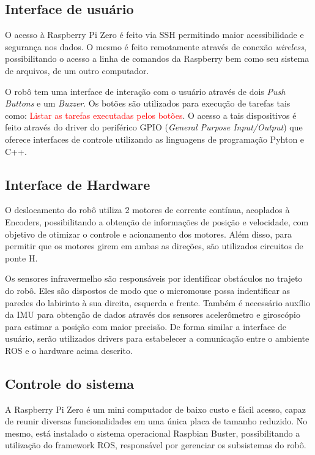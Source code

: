 \subsection{Interface de usuário}
\label{ssec:interface_de_usuario}
O acesso à Raspberry Pi Zero é feito via SSH permitindo maior acessibilidade e segurança nos dados. O mesmo é feito remotamente através de conexão \textit{wireless}, possibilitando o acesso a linha de comandos da Raspberry bem como seu sistema de arquivos, de um outro computador.
 
O robô tem uma interface de interação com o usuário através de dois \textit{Push Buttons} e um \textit{Buzzer}. Os botões são utilizados para execução de tarefas tais como: \textcolor{red}{Listar as tarefas executadas pelos botões}. O acesso a tais dispositivos é feito através do driver do periférico GPIO (\textit{General Purpose Input/Output}) que oferece interfaces de controle utilizando as linguagens de programação Pyhton e C++.

\subsection{Interface de Hardware}
\label{ssec:interface_de_hardware}
O deslocamento do robô utiliza 2 motores de corrente contínua, acoplados à Encoders, possibilitando a obtenção de informações de posição e velocidade, com objetivo de otimizar o controle e acionamento dos motores. Além disso, para permitir que os motores girem em ambas as direções, são utilizados circuitos de ponte H.
 
Os sensores infravermelho são responsáveis por identificar obstáculos no trajeto do robô. Eles são dispostos de modo que o micromouse possa indentificar as paredes do labirinto à sua direita, esquerda e frente. Também é necessário auxílio da IMU para obtenção de dados através dos sensores acelerômetro e giroscópio para estimar a posição com maior precisão. De forma similar a interface de usuário, serão utilizados drivers para estabelecer a comunicação entre o ambiente ROS e o hardware acima descrito.

\subsection{Controle do sistema}
\label{ssec:controle_do_sistema}
A Raspberry Pi Zero é um mini computador de baixo custo e fácil acesso, capaz de reunir diversas funcionalidades em uma única placa de tamanho reduzido.  No mesmo, está instalado o sistema operacional Raspbian Buster, possibilitando a utilização do framework ROS, responsável por gerenciar os subsistemas do robô.

